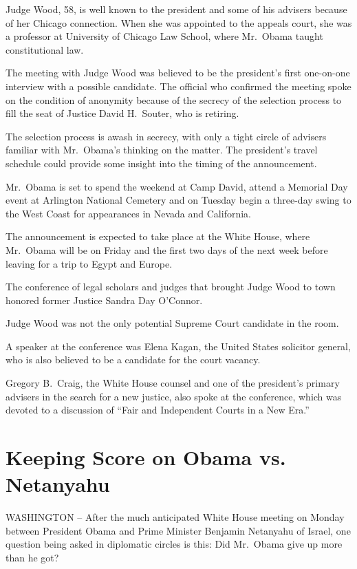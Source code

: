 \documentclass[12pt,a4paper,onecolumn]{article}
\begin{document}
Judge Wood, 58, is well known to the president and some of his advisers because of her Chicago
connection. When she was appointed to the appeals court, she was a professor at University of
Chicago Law School, where Mr.~Obama taught constitutional law.

The meeting with Judge Wood was believed to be the president's first one-on-one interview with a
possible candidate. The official who confirmed the meeting spoke on the condition of anonymity
because of the secrecy of the selection process to fill the seat of Justice David H.~Souter, who is
retiring.

The selection process is awash in secrecy, with only a tight circle of advisers familiar with
Mr.~Obama's thinking on the matter. The president's travel schedule could provide some insight into
the timing of the announcement.

Mr.~Obama is set to spend the weekend at Camp David, attend a Memorial Day event at Arlington
National Cemetery and on Tuesday begin a three-day swing to the West Coast for appearances in Nevada
and California.

The announcement is expected to take place at the White House, where Mr.~Obama will be on Friday and
the first two days of the next week before leaving for a trip to Egypt and Europe.

The conference of legal scholars and judges that brought Judge Wood to town honored former Justice
Sandra Day O'Connor.

Judge Wood was not the only potential Supreme Court candidate in the room.

A speaker at the conference was Elena Kagan, the United States solicitor general, who is also
believed to be a candidate for the court vacancy.

Gregory B.~Craig, the White House counsel and one of the president's primary advisers in the search
for a new justice, also spoke at the conference, which was devoted to a discussion of ``Fair and
Independent Courts in a New Era.''

\section{Keeping Score on Obama vs. Netanyahu}

WASHINGTON -- After the much anticipated White House meeting on Monday between President Obama and
Prime Minister Benjamin Netanyahu of Israel, one question being asked in diplomatic circles is this:
Did Mr.~Obama give up more than he got?
\end{document}
